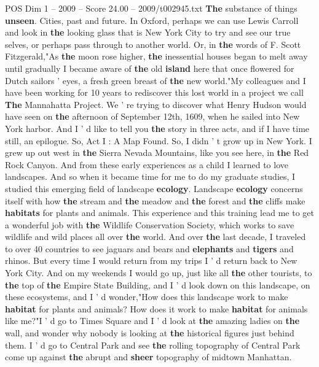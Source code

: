 \begin{textsample}{POS Dim 1 – 2009 – Score 24.00 – 2009/t002945.txt}  \label{ex:f1_pos_030}
\textbf{The} substance of things \textbf{unseen}.
Cities, past and future.
In Oxford, perhaps we can use Lewis Carroll and look in \textbf{the} looking glass that is New York City to try and see our true selves, or perhaps pass through to another world.
Or, in \textbf{the} words of F.
Scott Fitzgerald,"As \textbf{the} moon rose higher, \textbf{the} inessential houses began to melt away until gradually I became aware of \textbf{the} old \textbf{island} here that once flowered for Dutch sailors ' eyes, a fresh green breast of \textbf{the} new world."My colleagues and I have been working for 10 years to rediscover this lost world in a project we call \textbf{The} Mannahatta Project.
We ' re trying to discover what Henry Hudson would have seen on \textbf{the} afternoon of September 12th, 1609, when he sailed into New York harbor.
And I ' d like to tell you \textbf{the} story in three acts, and if I have time still, an epilogue.
So, Act I : A Map Found.
So, I didn ' t grow up in New York.
I grew up out west in \textbf{the} Sierra Nevada Mountains, like you see here, in \textbf{the} Red Rock Canyon.
And from these early experiences as a child I learned to love landscapes.
And so when it became time for me to do my graduate studies, I studied this emerging field of landscape \textbf{ecology}.
Landscape \textbf{ecology} concerns itself with how \textbf{the} stream and \textbf{the} meadow and \textbf{the} forest and \textbf{the} cliffs make \textbf{habitats} for plants and animals.
This experience and this training lead me to get a wonderful job with \textbf{the} Wildlife Conservation Society, which works to save wildlife and wild places all over \textbf{the} world.
And over \textbf{the} last decade, I traveled to over 40 countries to see jaguars and bears and \textbf{elephants} and \textbf{tigers} and rhinos.
But every time I would return from my trips I ' d return back to New York City.
And on my weekends I would go up, just like all \textbf{the} other tourists, to \textbf{the} top of \textbf{the} Empire State Building, and I ' d look down on this landscape, on these ecosystems, and I ' d wonder,"How does this landscape work to make \textbf{habitat} for plants and animals?
How does it work to make \textbf{habitat} for animals like me?"I ' d go to Times Square and I ' d look at \textbf{the} amazing ladies on \textbf{the} wall, and wonder why nobody is looking at \textbf{the} historical figures just behind them.
I ' d go to Central Park and see \textbf{the} rolling topography of Central Park come up against \textbf{the} abrupt and \textbf{sheer} topography of midtown Manhattan.

\end{textsample}
